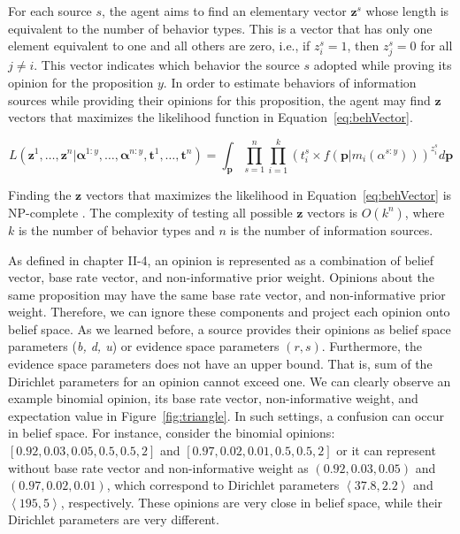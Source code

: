 \documentclass[a4,12pt]{ozu-thesis}
\begin{document}
For each source $s$, the agent aims to find an elementary vector $\mathbf{z}^{s}$ whose length is equivalent to the number of behavior types. This is a vector that has only one element equivalent to one and all others are zero, i.e., if $z_{i}^{s} =1$, then $z_{j}^{s} =0$ for all $j\neq i$. This vector indicates which behavior the source $s$ adopted while proving its opinion for the proposition $y$. In order to estimate behaviors of information sources while providing their opinions for this proposition, the agent may find $\mathbf{z}$ vectors that maximizes the likelihood function in Equation~\ref{eq:behVector}.

\begin{equation}
\label{eq:behVector}
L\left ( \mathbf{z}^{1},\ldots,\mathbf{z}^{n}|\mathbf{\alpha}^{1:y},\ldots,\mathbf{\alpha}^{n:y},\mathbf{t}^{1},\ldots,\mathbf{t}^{n} \right ) = \int_{\mathbf{p}}\prod_{s=1}^{n}\prod_{i=1}^{k}\left ( t_{i}^{s}\times f\left ( \mathbf{p}|m_{i}\left ( \alpha^{s:y} \right ) \right ) \right )^{z_{i}^{s}} d\mathbf{p}
\end{equation}


Finding the $\mathbf{z}$ vectors that maximizes the likelihood in Equation~\ref{eq:behVector} is NP-complete \cite{boyd2004convex}. The complexity of testing all possible $\mathbf{z}$ vectors is $O\left ( k^{n} \right )$, where $k$ is the number of behavior types and $n$ is the number of information sources.


As defined in chapter II-4, an opinion is represented as a combination of belief vector, base rate vector, and non-informative prior weight. Opinions about the same proposition may have the same base rate vector, and non-informative prior weight. Therefore, we can ignore these components and project each opinion onto belief space. As we learned before, a source provides their opinions as belief space parameters (\textit{b, d, u}) or evidence space parameters $\left( r, s \right) $. Furthermore, the evidence space parameters does not  have an upper bound. That is, sum of the Dirichlet parameters for an opinion cannot exceed one. We can clearly observe an example binomial opinion, its base rate vector, non-informative weight, and expectation value in 
Figure~\ref{fig:triangle}. In such settings, a confusion can occur in belief space. For instance, consider the binomial opinions: $\left [ 0.92, 0.03, 0.05, 0.5, 0.5, 2 \right ]$ and $\left [0.97, 0.02, 0.01, 0.5, 0.5, 2 \right]$ or it can represent without base rate vector and non-informative weight as $(0.92, 0.03, 0.05)$ and $(0.97, 0.02, 0.01)$, which correspond to Dirichlet parameters $\left \langle 37.8, 2.2 \right \rangle$ and $\left \langle 195, 5 \right \rangle$, respectively. These opinions are very close in belief space, while their Dirichlet parameters are very different.
\end{document}
